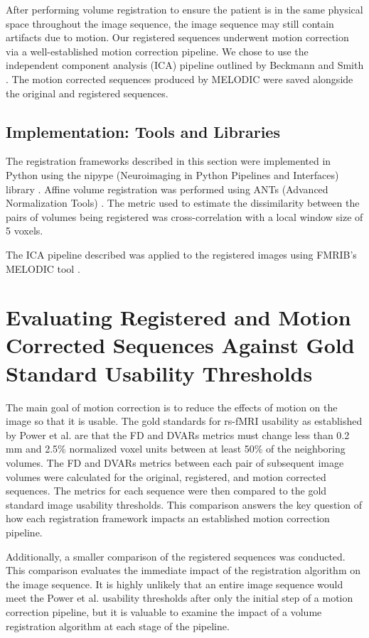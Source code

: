After performing volume registration to ensure the patient is in the same physical space throughout the image sequence, the image sequence may still contain artifacts due to motion. Our registered sequences underwent motion correction via a well-established motion correction pipeline. We chose to use the independent component analysis (ICA) pipeline outlined by Beckmann and Smith \cite{Beckmann2004}. The motion corrected sequences produced by MELODIC were saved alongside the original and registered sequences.  

\subsection{Implementation: Tools and Libraries}

The registration frameworks described in this section were implemented in Python using the nipype (Neuroimaging in Python Pipelines and Interfaces) library \cite{Gorgolewski2011}. Affine volume registration was performed using ANTs (Advanced Normalization Tools) \cite{Avants2014}. The metric used to estimate the dissimilarity between the pairs of volumes being registered was cross-correlation with a local window size of 5 voxels. 

The ICA pipeline described was applied to the registered images using FMRIB's MELODIC tool \cite{Beckmann2004}.

\section{Evaluating Registered and Motion Corrected Sequences Against Gold Standard Usability Thresholds}

The main goal of motion correction is to reduce the effects of motion on the image so that it is usable. The gold standards for rs-fMRI usability as established by Power et al. are that the FD and DVARs metrics must change less than 0.2 mm and 2.5\% normalized voxel units between at least 50\% of the neighboring volumes. The FD and DVARs metrics between each pair of subsequent image volumes were calculated for the original, registered, and motion corrected sequences. The metrics for each sequence were then compared to the gold standard image usability thresholds. This comparison answers the key question of how each registration framework impacts an established motion correction pipeline.

Additionally, a smaller comparison of the registered sequences was conducted. This comparison evaluates the immediate impact of the registration algorithm on the image sequence. It is highly unlikely that an entire image sequence would meet the Power et al. usability thresholds after only the initial step of a motion correction pipeline, but it is valuable to examine the impact of a volume registration algorithm at each stage of the pipeline. 

